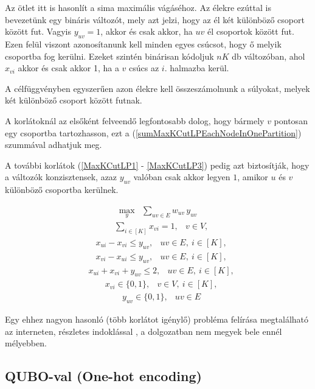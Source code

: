 Az ötlet itt is hasonlít a sima maximális vágáséhoz. Az élekre ezúttal is bevezetünk egy bináris változót, mely azt jelzi, hogy az él két különböző csoport között fut. Vagyis $y_{uv}=1$, akkor és csak akkor, ha $uv$ él csoportok között fut. Ezen felül viszont azonosítanunk kell minden egyes csúcsot, hogy ő melyik csoportba fog kerülni. Ezeket szintén binárisan kódoljuk $nK$ db változóban, ahol $x_{vi}$ akkor és csak akkor 1, ha a $v$ csúcs az $i.$ halmazba kerül. 

A célfüggvényben egyszerűen azon élekre kell összeszámolnunk a súlyokat, melyek két különböző csoport között futnak.

A korlátoknál az elsőként felveendő legfontosabb dolog, hogy bármely $v$ pontosan egy csoportba tartozhasson, ezt a (\ref{sumMaxKCutLPEachNodeInOnePartition}) szummával adhatjuk meg.

A további korlátok (\ref{MaxKCutLP1} - \ref{MaxKCutLP3}) pedig azt biztosítják, hogy a változók konzisztensek, azaz $y_{uv}$ valóban csak akkor legyen $1$, amikor $u$ és $v$ különböző csoportba kerülnek.

\begin{align} \max _{y} &\sum _{{uv} \in E} w_{uv} \, y_{uv}  \end{align}
\begin{align} &\sum _{i \in [K]} x_{vi} = 1,&v \in V, \label{sumMaxKCutLPEachNodeInOnePartition} \end{align}
\begin{align}&x_{ui} - x_{vi} \le y_{uv},& uv \in E, \ i\in [K], \label{MaxKCutLP1} \end{align}
\begin{align}&x_{vi} - x_{ui} \le y_{uv},& uv \in E, \ i\in [K], \end{align}
\begin{align}&x_{ui} + x_{vi} + y_{uv} \le 2,& uv \in E, \ i\in [K], \label{MaxKCutLP3} \end{align}
\begin{align}&x_{vi} \in \{{0,1}\} ,&v \in V, \ i\in [K],\end{align}
\begin{align}&y_{uv} \in \{{0,1}\} ,& uv \in E \label{MaxKCutLP5} \end{align}

Egy ehhez nagyon hasonló (több korlátot igénylő) probléma felírása megtalálható az interneten, részletes indoklással \cite{Hojny2021}, a dolgozatban nem megyek bele ennél mélyebben. 

\subsection{QUBO-val (One-hot encoding)}\label{sec:QUBOonehot}


